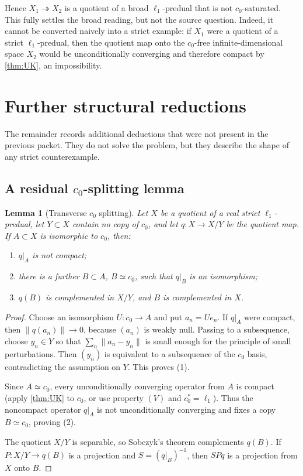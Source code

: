 \documentclass[11pt]{article}
\newtheorem{lemma}[theorem]{Lemma}
\theoremstyle{definition}
\newcommand{\onto}{\twoheadrightarrow}
\newcommand{\isom}{\simeq}
\begin{document}
Hence $X_1\onto X_2$ is a quotient of a broad $\ell_1$-predual that is not
$c_0$-saturated.  This fully settles the broad reading, but not the source
question.  Indeed, it cannot be converted naively into a strict example: if
$X_1$ were a quotient of a strict $\ell_1$-predual, then the quotient map onto
the $c_0$-free infinite-dimensional space $X_2$ would be unconditionally
converging and therefore compact by \cref{thm:UK}, an impossibility.

\section{Further structural reductions}

The remainder records additional deductions that were not present in the
previous packet.  They do not solve the problem, but they describe the shape
of any strict counterexample.

\subsection{A residual $c_0$-splitting lemma}

\begin{lemma}[Transverse $c_0$ splitting]\label{lem:transverse}
Let $X$ be a quotient of a real strict $\ell_1$-predual, let
$Y\subset X$ contain no copy of $c_0$, and let $q:X\to X/Y$ be the quotient
map.  If $A\subset X$ is isomorphic to $c_0$, then:
\begin{enumerate}
\item $q|_A$ is not compact;
\item there is a further $B\subset A$, $B\isom c_0$, such that $q|_B$ is an
      isomorphism;
\item $q(B)$ is complemented in $X/Y$, and $B$ is complemented in $X$.
\end{enumerate}
\end{lemma}

\begin{proof}
Choose an isomorphism $U:c_0\to A$ and put $a_n=Ue_n$.  If $q|_A$ were
compact, then $\|q(a_n)\|\to0$, because $(a_n)$ is weakly null.  Passing to a
subsequence, choose $y_n\in Y$ so that
$\sum_n\|a_n-y_n\|$ is small enough for the principle of small perturbations.
Then $(y_n)$ is equivalent to a subsequence of the $c_0$ basis, contradicting
the assumption on $Y$.  This proves (1).

Since $A\isom c_0$, every unconditionally converging operator from $A$ is
compact (apply \cref{thm:UK} to $c_0$, or use property $(V)$ and
$c_0^*=\ell_1$).  Thus the noncompact operator $q|_A$ is not unconditionally
converging and fixes a copy $B\isom c_0$, proving (2).

The quotient $X/Y$ is separable, so Sobczyk's theorem complements $q(B)$.
If $P:X/Y\to q(B)$ is a projection and $S=(q|_B)^{-1}$, then $SPq$ is a
projection from $X$ onto $B$.
\end{proof}
\end{document}
